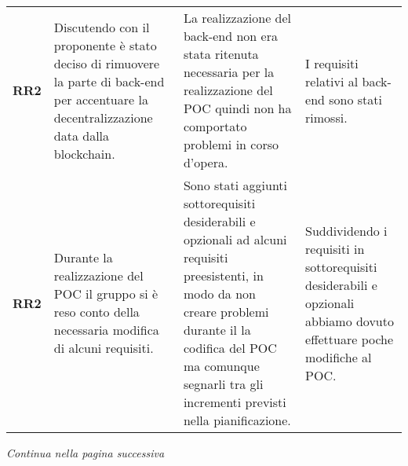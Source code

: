 \begin{table}[H]
\begin{tabular}{c|p{5cm}|p{5cm}|p{5cm}}
    \hline
    \textbf{RR2} & Discutendo con il proponente è stato deciso di rimuovere la parte di back-end per accentuare la decentralizzazione data dalla blockchain\glo{}. & La realizzazione del back-end non era stata ritenuta necessaria per la realizzazione del POC quindi non ha comportato problemi in corso d'opera.                                                                                   & I requisiti relativi al back-end sono stati rimossi.                                                                                                                                           \\
    \textbf{RR2} & Durante la realizzazione del POC il gruppo si è reso conto della necessaria modifica di alcuni requisiti.                                       & Sono stati aggiunti sottorequisiti desiderabili e opzionali ad alcuni requisiti preesistenti, in modo da non creare problemi durante il la codifica del POC ma comunque segnarli tra gli incrementi previsti nella pianificazione. & Suddividendo i requisiti in sottorequisiti desiderabili e opzionali abbiamo dovuto effettuare poche modifiche al POC.                                                                          \\
    \hline
  \end{tabular}
\end{table}
\begin{center}
  \textit{\small Continua nella pagina successiva}
\end{center}
